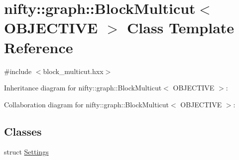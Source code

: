 \hypertarget{classnifty_1_1graph_1_1BlockMulticut}{}\section{nifty\+:\+:graph\+:\+:Block\+Multicut$<$ O\+B\+J\+E\+C\+T\+I\+V\+E $>$ Class Template Reference}
\label{classnifty_1_1graph_1_1BlockMulticut}


{\ttfamily \#include $<$block\+\_\+multicut.\+hxx$>$}



Inheritance diagram for nifty\+:\+:graph\+:\+:Block\+Multicut$<$ O\+B\+J\+E\+C\+T\+I\+V\+E $>$\+:


Collaboration diagram for nifty\+:\+:graph\+:\+:Block\+Multicut$<$ O\+B\+J\+E\+C\+T\+I\+V\+E $>$\+:
\subsection*{Classes}
\begin{DoxyCompactItemize}
\item 
struct \hyperlink{structnifty_1_1graph_1_1BlockMulticut_1_1Settings}{Settings}
\end{DoxyCompactItemize}
